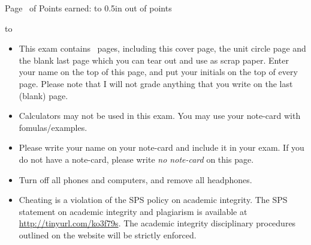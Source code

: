 \documentclass[11pt,answers]{exam}
\begin{document}
\extrawidth{-0.3in}
\pagestyle{headandfoot}

\setlength{\hoffset}{-.25in}

\extraheadheight{-.4in}
\runningheadrule
{} 



\firstpagefooter{\bfseries{}}{}{} 


\runningheader{\bfseries {}}%
              {\bfseries {}}%
              {Page \thepage\ 
							of \numpages 
							}
\runningfooter{} %
                {}
                {Points earned: \hbox to 0.5in{\hrulefill}
                 out of  \pointsonpage{\thepage} points}
                 
						

\vspace*{0.2cm}
\hbox to 
\vspace{0.2in}

\begin{itemize}
	\item This exam contains \numpages\ pages, including this cover page, the unit circle page and the blank last page which you can tear out and use as scrap paper. Enter
your name on the top of this page, and put your initials
on the top of every page. Please note that I will not grade anything that you write on the last (blank) page.

\item Calculators may not be used in this exam. You may use your note-card with fomulas/examples. 

\item Please write your name on your note-card and include it in your exam. If you do not have a note-card, please write {\textit {no note-card}} on this page.
\item Turn off all phones and computers, and remove all headphones.
\item Cheating is a violation of the SPS policy on academic integrity. The SPS statement on academic integrity and
plagiarism is available at \url{http://tinyurl.com/ko3f79s}. The academic integrity disciplinary procedures outlined on the
website will be strictly enforced.

\end{itemize}
\end{document}
